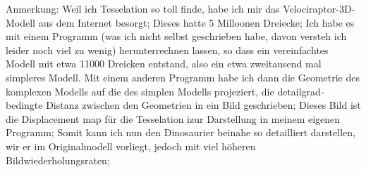 Anmerkung: Weil ich Tesselation so toll finde, habe ich mir das Velociraptor-3D-Modell aus dem Internet besorgt; Dieses hatte 5 Milloonen Dreiecke; Ich habe es mit einem Programm (was ich nicht selbst geschrieben habe, davon versteh ich leider noch viel zu wenig) herunterrechnen lassen, so  dass ein vereinfachtes Modell mit etwa 11000 Dreicken entstand, also ein etwa zweitausend mal simpleres Modell. Mit einem anderen Programm habe ich dann die Geometrie des komplexen Modells auf die des simplen Modells projeziert, die detailgrad-bedingte Distanz zwischen den Geometrien in ein Bild geschrieben; Dieses Bild ist die Displacement map für die Tesselation izur Darstellung in meinem eigenen Programm; Somit kann ich nun den Dinosaurier beinahe so detailliert darstellen, wir er im Originalmodell vorliegt, jedoch mit viel höheren Bildwiederholungsraten; 

	  

\clearpage
